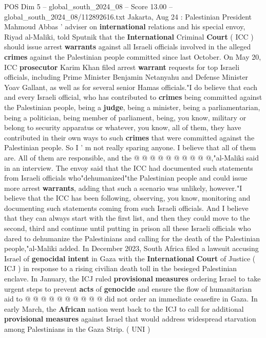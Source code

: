 \begin{textsample}{POS Dim 5 – global\_south\_2024\_08 – Score 13.00 – global\_south\_2024\_08/112892616.txt}  \label{ex:f5_pos_285}
Jakarta, Aug 24 : Palestinian President Mahmoud Abbas ' adviser on \textbf{international} relations and his special envoy, Riyad al-Maliki, told Sputnik that the \textbf{International} Criminal \textbf{Court} ( ICC ) should issue arrest \textbf{warrants} against all Israeli officials involved in the alleged \textbf{crimes} against the Palestinian people committed since last October.
On May 20, ICC \textbf{prosecutor} Karim Khan filed arrest \textbf{warrant} requests for top Israeli officials, including Prime Minister Benjamin Netanyahu and Defense Minister Yoav Gallant, as well as for several senior Hamas officials."I do believe that each and every Israeli official, who has contributed to \textbf{crimes} being committed against the Palestinian people, being a \textbf{judge}, being a minister, being a parliamentarian, being a politician, being member of parliament, being, you know, military or belong to security apparatus or whatever, you know, all of them, they have contributed in their own ways to such \textbf{crimes} that were committed against the Palestinian people.
So I ' m not really sparing anyone.
I believe that all of them are.
All of them are responsible, and the @ @ @ @ @ @ @ @ @ @,"al-Maliki said in an interview.
The envoy said that the ICC had documented such statements from Israeli officials who"dehumanized"the Palestinian people and could issue more arrest \textbf{warrants}, adding that such a scenario was unlikely, however."I believe that the ICC has been following, observing, you know, monitoring and documenting such statements coming from such Israeli officials.
And I believe that they can always start with the first list, and then they could move to the second, third and continue until putting in prison all these Israeli officials who dared to dehumanize the Palestinians and calling for the death of the Palestinian people,"al-Maliki added.
In December 2023, South Africa filed a lawsuit accusing Israel of \textbf{genocidal} \textbf{intent} in Gaza with the \textbf{International} \textbf{Court} of Justice ( ICJ ) in response to a rising civilian death toll in the besieged Palestinian enclave.
In January, the ICJ ruled \textbf{provisional} \textbf{measures} ordering Israel to take urgent steps to prevent \textbf{acts} of \textbf{genocide} and ensure the flow of humanitarian aid to @ @ @ @ @ @ @ @ @ @ did not order an immediate ceasefire in Gaza.
In early March, the \textbf{African} nation went back to the ICJ to call for additional \textbf{provisional} \textbf{measures} against Israel that would address widespread starvation among Palestinians in the Gaza Strip. ( UNI )

\end{textsample}

